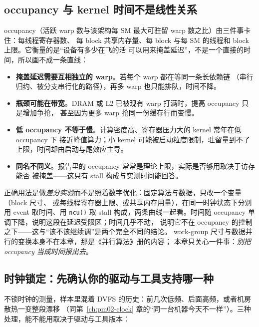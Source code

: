 \documentclass[12pt,a4paper,fontset=fandol]{ctexbook}
\newcommand{\Fn}[1]{\texttt{#1()}}
\begin{document}
\subsection{occupancy 与 kernel 时间不是线性关系}
\label{sub:pm11-occupancy}

occupancy（活跃 warp 数与该架构每 SM 最大可驻留 warp 数之比）由三件事卡住：每线程寄存器数、
每 block 共享内存量、每 block 与每 SM 的线程和 block 上限。它衡量的是``设备有多少在飞的活
可以用来掩盖延迟''，不是一个直接的时间，所以画不成一条直线：

\begin{itemize}
  \item \textbf{掩盖延迟需要互相独立的 warp}。若每个 warp 都在等同一条长依赖链
        （串行归约、被分支串行化的路径），再多 warp 也只能排队，时间不降。
  \item \textbf{瓶颈可能在带宽}。DRAM 或 L2 已被现有 warp 打满时，提高 occupancy 只是增加争抢，
        甚至因为更多 warp 抢同一份缓存行而变慢。
  \item \textbf{低 occupancy 不等于慢}。计算密度高、寄存器压力大的 kernel 常年在低 occupancy 下
        接近峰值算力；小 kernel 可能被启动粒度限制，驻留量到不了上限，时间却由启动与尾效应主导。
  \item \textbf{同名不同义}。报告里的 occupancy 常常是理论上限，实际是否够用取决于访存能否
        被掩盖——这只有 stall 构成与实测时间能回答。
\end{itemize}

正确用法是做\emph{差分实验}而不是照着数字优化：固定算法与数据，只改一个变量（block 尺寸、
或每线程寄存器上限、或共享内存用量），在同一时钟状态下分别用 event 取时间、用 \Fn{ncu} 取
stall 构成，两条曲线一起看。时间随 occupancy 单调下降，说明这段在延迟受限区；时间几乎不动，
说明它不在 occupancy 的控制之下——这与``该不该继续调''是两个完全不同的结论。
work-group 尺寸与数据并行的变换本身不在本章，那是《并行算法》册的内容；
本章只关心一件事：\emph{别把 occupancy 当成时间报出去}。

\subsection{时钟锁定：先确认你的驱动与工具支持哪一种}
\label{sub:pm11-clocklock}

不锁时钟的测量，样本里混着 DVFS 的历史：前几次低频、后面高频，或者机房散热一变整段漂移
（同第~\ref{ch:pm02-clock} 章的``同一台机器今天不一样''）。三种处理，能不能用取决于驱动与工具版本：
\end{document}
